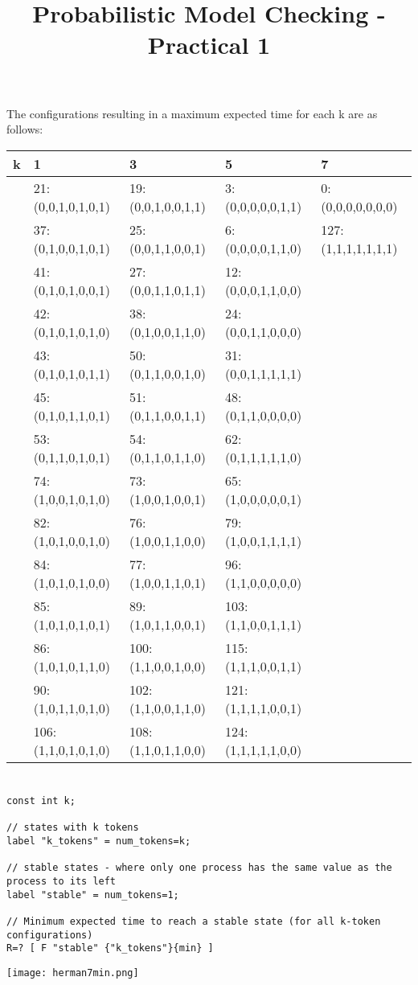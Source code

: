 \documentclass[12pt]{article}
\title{Probabilistic Model Checking - Practical 1}
\date{}
\begin{document}
\maketitle

\section {}

The configurations resulting in a maximum expected time for each k are as follows:
\begin{table}[!htb]
\begin{tabular}{l|l|l|l|l}
	k & 1 & 3 & 5 & 7 \\ \hline
	& 21:(0,0,1,0,1,0,1) & 19:(0,0,1,0,0,1,1) & 3:(0,0,0,0,0,1,1) & 0: (0,0,0,0,0,0,0) \\
	& 37:(0,1,0,0,1,0,1) & 25:(0,0,1,1,0,0,1) & 6:(0,0,0,0,1,1,0) & 127: (1,1,1,1,1,1,1) \\
	& 41:(0,1,0,1,0,0,1) & 27:(0,0,1,1,0,1,1) & 12:(0,0,0,1,1,0,0) \\
	& 42:(0,1,0,1,0,1,0) & 38:(0,1,0,0,1,1,0) & 24:(0,0,1,1,0,0,0) \\
	& 43:(0,1,0,1,0,1,1) & 50:(0,1,1,0,0,1,0) & 31:(0,0,1,1,1,1,1) \\
	& 45:(0,1,0,1,1,0,1) & 51:(0,1,1,0,0,1,1) & 48:(0,1,1,0,0,0,0) \\
	& 53:(0,1,1,0,1,0,1) & 54:(0,1,1,0,1,1,0) & 62:(0,1,1,1,1,1,0) \\
	& 74:(1,0,0,1,0,1,0) & 73:(1,0,0,1,0,0,1) & 65:(1,0,0,0,0,0,1) \\
	& 82:(1,0,1,0,0,1,0) & 76:(1,0,0,1,1,0,0) & 79:(1,0,0,1,1,1,1) \\
	& 84:(1,0,1,0,1,0,0) & 77:(1,0,0,1,1,0,1) & 96:(1,1,0,0,0,0,0) \\
	& 85:(1,0,1,0,1,0,1) & 89:(1,0,1,1,0,0,1) & 103:(1,1,0,0,1,1,1) \\
	& 86:(1,0,1,0,1,1,0) & 100:(1,1,0,0,1,0,0) & 115:(1,1,1,0,0,1,1) \\
	& 90:(1,0,1,1,0,1,0) & 102:(1,1,0,0,1,1,0) & 121:(1,1,1,1,0,0,1) \\
	& 106:(1,1,0,1,0,1,0) & 108:(1,1,0,1,1,0,0) & 124:(1,1,1,1,1,0,0) \\
\end{tabular}
\end{table}
\clearpage
\section {}
\begin{lstlisting}
const int k;

// states with k tokens
label "k_tokens" = num_tokens=k;

// stable states - where only one process has the same value as the process to its left
label "stable" = num_tokens=1;

// Minimum expected time to reach a stable state (for all k-token configurations)
R=? [ F "stable" {"k_tokens"}{min} ]
\end{lstlisting}

\texttt{[image: herman7min.png]}

\endsection
\end{document}
